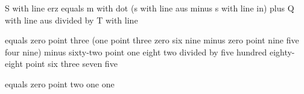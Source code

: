 S with line erz equals m with dot (s with line aus minus s with line in) plus Q with line aus divided by T with line

equals zero point three (one point three zero six nine minus zero point nine five four nine) minus sixty-two point one eight two divided by five hundred eighty-eight point six three seven five

equals zero point two one one